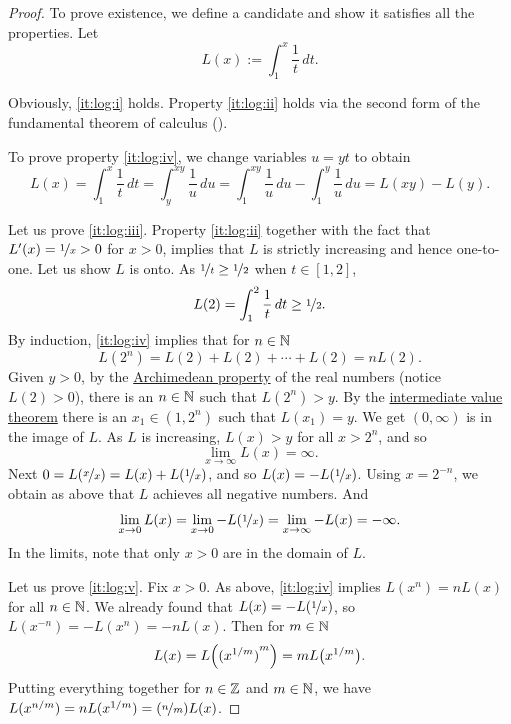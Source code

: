 \begin{proof}
To prove existence, we define a candidate and show it satisfies
all the properties.  Let
\begin{equation*}
L(x) := \int_1^x \frac{1}{t}\,dt .
\end{equation*}

Obviously, \ref{it:log:i} holds.  Property \ref{it:log:ii} holds
via the second form of the fundamental theorem of calculus
().

To prove property \ref{it:log:iv},
we change variables $u=yt$ to obtain
\begin{equation*}
L(x) =
\int_1^{x} \frac{1}{t}\,dt
=
\int_y^{xy} \frac{1}{u}\,du
=
\int_1^{xy} \frac{1}{u}\,du
-
\int_1^{y} \frac{1}{u}\,du
=
L(xy)-L(y) .
\end{equation*}

Let us prove \ref{it:log:iii}.
Property \ref{it:log:ii} together with the fact that $L'(x) = \nicefrac{1}{x} > 0$ 
for $x > 0$, implies that $L$
is strictly increasing and hence one-to-one.
Let us show $L$ is onto.  
As $\nicefrac{1}{t} \geq \nicefrac{1}{2}$ when $t \in [1,2]$,
\begin{equation*}
L(2) = \int_1^2 \frac{1}{t} \,dt \geq \nicefrac{1}{2} .
\end{equation*}
By induction, \ref{it:log:iv} implies that for $n \in {\mathbb{N}}$
\begin{equation*}
L(2^n) = L(2) + L(2) + \cdots + L(2) = n L(2) .
\end{equation*}
Given $y > 0$, 
by the \hyperref[thm:arch:i]{Archimedean property} of the real numbers
(notice $L(2) > 0$), there is an $n \in {\mathbb{N}}$ such that
$L(2^n) > y$.  By the
\hyperref[IVT:thm]{intermediate value theorem}
there is an $x_1 \in (1,2^n)$ such that $L(x_1) = y$.  We get
$(0,\infty)$ is in the image of $L$.
As $L$ is increasing, $L(x) > y$ for all $x > 2^n$, and so
\begin{equation*}
\lim_{x\to\infty} L(x) = \infty .
\end{equation*}
Next
$0 = L(\nicefrac{x}{x}) = L(x) + L(\nicefrac{1}{x})$, and
so $L(x) = - L(\nicefrac{1}{x})$.  Using $x=2^{-n}$, we obtain
as above that $L$ achieves all negative numbers.  And
\begin{equation*}
\lim_{x \to 0} L(x) = 
\lim_{x \to 0} -L(\nicefrac{1}{x})
=
\lim_{x \to \infty} -L(x)
=  - \infty .
\end{equation*}
In the limits, note that only $x > 0$ are in the domain of $L$.

Let us prove \ref{it:log:v}.
Fix $x > 0$.
As above, \ref{it:log:iv} implies
$L(x^n) = n L(x)$
for all $n \in {\mathbb{N}}$.
We already found that
$L(x) = - L(\nicefrac{1}{x})$,
so $L(x^{-n}) = - L(x^n) = -n L(x)$.  Then for $m \in {\mathbb{N}}$
\begin{equation*}
L(x) = L\Bigl({(x^{1/m})}^m\Bigr) = m L\bigl(x^{1/m}\bigr) .
\end{equation*}
Putting everything together for $n \in {\mathbb{Z}}$ and $m \in {\mathbb{N}}$, we have
$L(x^{n/m}) = n L(x^{1/m}) = (\nicefrac{n}{m}) L(x)$.


\end{proof}
